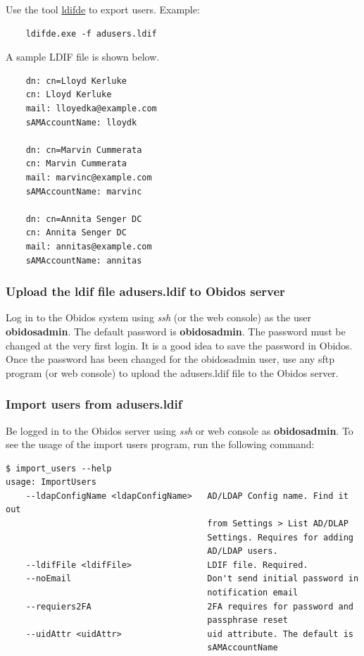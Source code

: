 Use the tool \href{https://docs.microsoft.com/en-us/previous-versions/windows/it-pro/windows-server-2012-  r2-and-2012/cc731033(v=ws.11}{ldifde}
to export users. Example:
\begin{verbatim}
    ldifde.exe -f adusers.ldif
\end{verbatim}

A sample LDIF file is shown below.

\begin{verbatim}
    dn: cn=Lloyd Kerluke
    cn: Lloyd Kerluke
    mail: lloyedka@example.com
    sAMAccountName: lloydk
    
    dn: cn=Marvin Cummerata
    cn: Marvin Cummerata
    mail: marvinc@example.com
    sAMAccountName: marvinc
    
    dn: cn=Annita Senger DC
    cn: Annita Senger DC
    mail: annitas@example.com
    sAMAccountName: annitas    
\end{verbatim}

\subsubsection{Upload the ldif file adusers.ldif to Obidos server}

Log in to the Obidos system using \textit{ssh} (or the web console) as the user \textbf{obidosadmin}. The
default password is \textbf{obidosadmin}. The password must be changed at the very first
login. It is a good idea to save the password in Obidos. 
Once the password has been changed for the obidosadmin user, use any sftp program
(or web console) to upload the adusers.ldif file to the Obidos server.

\subsubsection{Import users from adusers.ldif}

Be logged in to the Obidos server using \textit{ssh} or web console as \textbf{obidosadmin}. 
To see the usage of the import users program, run the following command:

\begin{verbatim}
$ import_users --help
usage: ImportUsers
    --ldapConfigName <ldapConfigName>   AD/LDAP Config name. Find it out
                                        from Settings > List AD/DLAP
                                        Settings. Requires for adding
                                        AD/LDAP users.
    --ldifFile <ldifFile>               LDIF file. Required.
    --noEmail                           Don't send initial password in
                                        notification email
    --requiers2FA                       2FA requires for password and
                                        passphrase reset
    --uidAttr <uidAttr>                 uid attribute. The default is
                                        sAMAccountName    
\end{verbatim}

